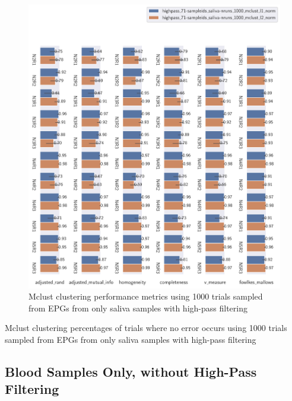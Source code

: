 \begin{theappendices}
\begin{figure}[H]
\centering
\includegraphics[width=\textwidth]{./figures/clust_comparison/highpass_71-sampleids_saliva-nruns_1000_mclust.pdf}
\caption{Mclust clustering performance metrics using 1000 trials sampled from EPGs from only saliva samples with high-pass filtering}
\label{fig:highpass_71-sampleids_saliva-nruns_1000_mclust}
\end{figure}

\begin{table}[H]
\centering
{}
\caption{Mclust clustering percentages of trials where no error occurs using 1000 trials sampled from EPGs from only saliva samples with high-pass filtering}
\label{table:highpass_71-sampleids_saliva-nruns_1000_mclust}
\end{table}

\subsection{Blood Samples Only, without High-Pass Filtering}


\end{theappendices}
